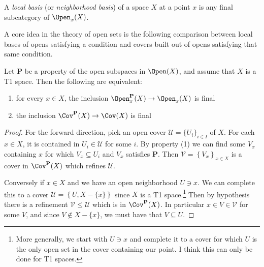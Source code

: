 \documentclass[11pt]{amsart}
\begin{document}
\begin{terminology} A \emph{local basis} (or \emph{neighborhood basis}) of a space $X$ at a point $x$ is any final subcategory of $\Open_x(X)$.
\end{terminology}

A core idea in the theory of open sets is the following comparison between local bases of opens satisfying a condition and covers built out of opens satisfying that same condition.

\begin{proposition}\label{prop:local-properties-cover-properties} 
Let $\mathbf{P}$ be a property of the open subspaces in $\Open(X)$, and assume that $X$ is a T1 space. Then the following are equivalent:
\begin{enumerate}
    \item for every $x\in X$, the inclusion $\Open_x^{\mathbf{P}}(X) \to \Open_x(X)$ is final %
    \item the inclusion $\Cov^{\mathbf{P}}(X) \to \Cov(X)$ is final %
\end{enumerate}
\end{proposition}
\begin{proof} For the forward direction, pick an open cover $\mathcal{U} = \{U_i\}_{i\in I}$ of $X$. For each $x\in X$, it is contained in $U_i\in \mathcal{U}$ for some $i$. By property (1) we can find some $V_x$ containing $x$ for which $V_x \subseteq U_i$ and $V_x$ satisfies $\mathbf{P}$. Then $\mathcal{V} = \left\{ V_x \right\}_{x\in X}$ is a cover in $\Cov^{\mathbf{P}}(X)$ which refines $\mathcal{U}$.

Conversely if $x\in X$ and we have an open neighborhood $U\ni x$. We can complete this to a cover $\mathcal{U} = \left\{ U, X-\{x\} \right\}$ since $X$ is a T1 space.\footnote{More generally, we start with $U\ni x$ and complete it to a cover for which $U$ is the only open set in the cover containing our point. I think this can only be done for T1 spaces.} Then by hypothesis there is a refinement $\mathcal{V} \le \mathcal{U}$ which is in $\Cov^{\mathbf{P}}(X)$. In particular $x\in V \in \mathcal{V}$ for some $V$, and since $V \notin X\minus\{x\}$, we must have that $V \subseteq U$.
\end{proof}
\end{document}

